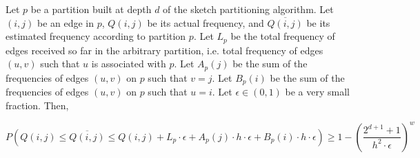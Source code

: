 \begin{theorem}
\label{thm:efreqguarantee}
Let $p$ be a partition built at depth $d$ of the sketch partitioning algorithm. Let $(i,j)$ be an edge in $p$, $Q(i,j)$ be its actual frequency, and $\overline{Q(i,j)}$ be its estimated frequency according to partition $p$. Let $L_p$ be the total frequency of edges received so far in the arbitrary partition, i.e. total frequency of edges $(u,v)$ such that $u$ is associated with $p$. Let $A_p(j)$ be the sum of the frequencies of edges $(u,v)$ on $p$ such that $v=j$. Let $B_p(i)$ be the sum of the frequencies of edges $(u,v)$ on $p$ such that $u=i$. Let $\epsilon \in (0,1)$ be a very small fraction. Then,
  
  \[
P(Q(i,j) \leq \overline{Q(i,j)} \leq Q(i,j) + L_p \cdot \epsilon + A_p(j) \cdot h \cdot \epsilon + B_p(i) \cdot h \cdot \epsilon) \geq 1-(\frac{2^{d+1}+1}{h^2\cdot\epsilon})^w
\]

\end{theorem}

